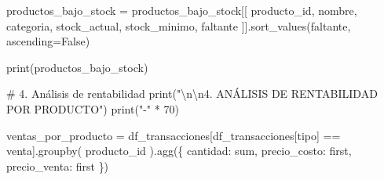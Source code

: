 \documentclass[
  doc,
  floatsintext,
  longtable,
  a4paper,
  nolmodern,
  notxfonts,
  notimes,
  12pt,
  colorlinks=true,linkcolor=blue,citecolor=blue,urlcolor=blue]{apa7}
\newenvironment{Shaded}{\begin{snugshade}}{\end{snugshade}}
\newcommand{\BuiltInTok}[1]{\textcolor[rgb]{0.00,0.23,0.31}{#1}}
\newcommand{\CharTok}[1]{\textcolor[rgb]{0.13,0.47,0.30}{#1}}
\newcommand{\CommentTok}[1]{\textcolor[rgb]{0.37,0.37,0.37}{#1}}
\newcommand{\DecValTok}[1]{\textcolor[rgb]{0.68,0.00,0.00}{#1}}
\newcommand{\NormalTok}[1]{\textcolor[rgb]{0.00,0.23,0.31}{#1}}
\newcommand{\OperatorTok}[1]{\textcolor[rgb]{0.37,0.37,0.37}{#1}}
\newcommand{\StringTok}[1]{\textcolor[rgb]{0.13,0.47,0.30}{#1}}
\newcommand{\VariableTok}[1]{\textcolor[rgb]{0.07,0.07,0.07}{#1}}
\begin{document}
\begin{Shaded}
\begin{Highlighting}[]
\NormalTok{productos\_bajo\_stock }\OperatorTok{=}\NormalTok{ productos\_bajo\_stock[[}
    \StringTok{\textquotesingle{}producto\_id\textquotesingle{}}\NormalTok{, }\StringTok{\textquotesingle{}nombre\textquotesingle{}}\NormalTok{, }\StringTok{\textquotesingle{}categoria\textquotesingle{}}\NormalTok{, }\StringTok{\textquotesingle{}stock\_actual\textquotesingle{}}\NormalTok{, }\StringTok{\textquotesingle{}stock\_minimo\textquotesingle{}}\NormalTok{, }\StringTok{\textquotesingle{}faltante\textquotesingle{}}
\NormalTok{]].sort\_values(}\StringTok{\textquotesingle{}faltante\textquotesingle{}}\NormalTok{, ascending}\OperatorTok{=}\VariableTok{False}\NormalTok{)}

\BuiltInTok{print}\NormalTok{(productos\_bajo\_stock)}

\CommentTok{\# 4. Análisis de rentabilidad}
\BuiltInTok{print}\NormalTok{(}\StringTok{"}\CharTok{\textbackslash{}n\textbackslash{}n}\StringTok{4. ANÁLISIS DE RENTABILIDAD POR PRODUCTO"}\NormalTok{)}
\BuiltInTok{print}\NormalTok{(}\StringTok{"{-}"} \OperatorTok{*} \DecValTok{70}\NormalTok{)}

\NormalTok{ventas\_por\_producto }\OperatorTok{=}\NormalTok{ df\_transacciones[df\_transacciones[}\StringTok{\textquotesingle{}tipo\textquotesingle{}}\NormalTok{] }\OperatorTok{==} \StringTok{\textquotesingle{}venta\textquotesingle{}}\NormalTok{].groupby(}
    \StringTok{\textquotesingle{}producto\_id\textquotesingle{}}
\NormalTok{).agg(\{}
    \StringTok{\textquotesingle{}cantidad\textquotesingle{}}\NormalTok{: }\StringTok{\textquotesingle{}sum\textquotesingle{}}\NormalTok{,}
    \StringTok{\textquotesingle{}precio\_costo\textquotesingle{}}\NormalTok{: }\StringTok{\textquotesingle{}first\textquotesingle{}}\NormalTok{,}
    \StringTok{\textquotesingle{}precio\_venta\textquotesingle{}}\NormalTok{: }\StringTok{\textquotesingle{}first\textquotesingle{}}
\NormalTok{\})}


\end{Highlighting}
\end{Shaded}
\end{document}
